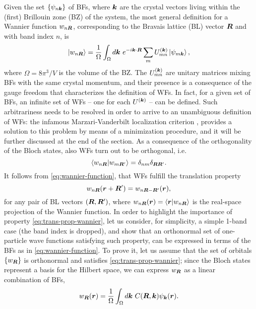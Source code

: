 Given the set $\{ \psi_{n{\bm k}} \}$ of BFs, where ${\bm k}$ are the crystal vectors living within the (first) Brillouin zone (BZ) of the system, the most general definition for a Wannier function $w_{n{\bm R}}$, corresponding to the Bravais lattice (BL) vector ${\bm R}$ and with band index $n$, is
%
\begin{equation}
    \ket{w_{n{\bm R}}} = \frac{1}{\Omega} \int_{\Omega} d{\bm k} \ e^{-i{\bm k} \cdot {\bm R}} \sum_m U^{({\bm k})}_{mn} \ket{\psi_{m{\bm k}}} ,
    \label{eq:wannier-function}
\end{equation}
%
where $\Omega = 8\pi^3 / V$ is the volume of the BZ. The $U^{({\bm k})}_{mn}$ are unitary matrices mixing BFs with the same crystal momentum, and their presence is a consequence of the gauge freedom that characterizes the definition of WFs. In fact, for a given set of BFs, an infinite set of WFs -- one for each $U^{({\bm k})}$ -- can be defined. Such arbitrariness needs to be resolved in order to arrive to an unambiguous definition of WFs: the infamous Marzari-Vanderbilt localization criterion \cite{marzari_maximally_1997}, provides a solution to this problem by means of a minimization procedure, and it will be further discussed at the end of the section. As a consequence of the orthogonality of the Bloch states, also WFs turn out to be orthogonal, i.e.
%
\begin{equation}
    \braket{w_{n{\bm R}} | w_{m{\bm R}'}} = \delta_{nm} \delta_{{\bm R} {\bm R}'} .
    \label{eq:orthogonality-wannier}
\end{equation}
%
It follows from \cref{eq:wannier-function}, that WFs fulfill the translation property
%
\begin{equation}
    w_{n{\bm R}}({\bm r} + {\bm R}') = w_{n{\bm R} - {\bm R}'}({\bm r}) ,
    \label{eq:trans-prop-wannier}
\end{equation}
%
for any pair of BL vectors $({\bm R},{\bm R}')$, where $w_{n{\bm R}}({\bm r}) = \braket{{\bm r}|w_{n{\bm R}}}$ is the real-space projection of the Wannier function. In order to highlight the importance of property \eqref{eq:trans-prop-wannier}, let us consider, for simplicity, a simple 1-band case (the band index is dropped), and show that an orthonormal set of one-particle wave functions satisfying such property, can be expressed in terms of the BFs as in \cref{eq:wannier-function}. To prove it, let us assume that the set of orbitals $\{ w_{{\bm R}} \}$ is orthonormal and satisfies \cref{eq:trans-prop-wannier}; since the Bloch states represent a basis for the Hilbert space, we can express $w_{{\bm R}}$ as a linear combination of BFs,
%
\begin{equation}
    w_{{\bm R}}({\bm r}) = \frac{1}{\Omega} \int_{\Omega} d{\bm k} \ C({\bm R},{\bm k}) \psi_{{\bm k}}({\bm r}) .
    \label{eq:wannier-bloch-linear-combination}
\end{equation}
